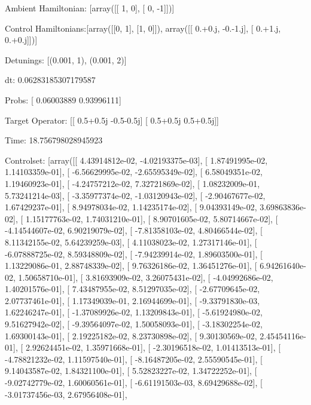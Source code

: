 \documentclass{article}
\begin{document}
    

\newpage

Ambient Hamiltonian: [array([[ 1,  0],
       [ 0, -1]])]

Control Hamiltonians:[array([[0, 1],
       [1, 0]]), array([[ 0.+0.j, -0.-1.j],
       [ 0.+1.j,  0.+0.j]])]

Detunings: [(0.001, 1), (0.001, 2)]

 dt: 0.06283185307179587

Probs: [ 0.06003889  0.93996111]

Target Operator: [[ 0.5+0.5j -0.5-0.5j]
 [ 0.5+0.5j  0.5+0.5j]]

Time: 18.756798028945923

Controlset: [array([[  4.43914812e-02,  -4.02193375e-03],
       [  1.87491995e-02,   1.14103359e-01],
       [ -6.56629995e-02,  -2.65595349e-02],
       [  6.58049351e-02,   1.19460923e-01],
       [ -4.24757212e-02,   7.32721869e-02],
       [  1.08232009e-01,   5.73241214e-03],
       [ -3.35977374e-02,  -1.03120943e-02],
       [ -2.90467677e-02,   1.67429237e-01],
       [  8.94978034e-02,   1.14235174e-02],
       [  9.04393149e-02,   3.69863836e-02],
       [  1.15177763e-02,   1.74031210e-01],
       [  8.90701605e-02,   5.80714667e-02],
       [ -4.14544607e-02,   6.90219079e-02],
       [ -7.81358103e-02,   4.80466544e-02],
       [  8.11342155e-02,   5.64239259e-03],
       [  4.11038023e-02,   1.27317146e-01],
       [ -6.07888725e-02,   8.59348809e-02],
       [ -7.94239914e-02,   1.89603500e-01],
       [  1.13229086e-01,   2.88748339e-02],
       [  9.76326186e-02,   1.36451276e-01],
       [  6.94261640e-02,   1.50658710e-01],
       [  3.81693909e-02,   3.26075431e-02],
       [ -4.04992686e-02,   1.40201576e-01],
       [  7.43487955e-02,   8.51297035e-02],
       [ -2.67709645e-02,   2.07737461e-01],
       [  1.17349039e-01,   2.16944699e-01],
       [ -9.33791830e-03,   1.62246247e-01],
       [ -1.37089926e-02,   1.13209843e-01],
       [ -5.61924980e-02,   9.51627942e-02],
       [ -9.39564097e-02,   1.50058093e-01],
       [ -3.18302254e-02,   1.69300143e-01],
       [  2.19225182e-02,   8.23730898e-02],
       [  9.30130569e-02,   2.45454116e-01],
       [  2.92624451e-02,   1.35971668e-01],
       [ -2.30196518e-02,   1.01413513e-01],
       [ -4.78821232e-02,   1.11597540e-01],
       [ -8.16487205e-02,   2.55590545e-01],
       [  9.14043587e-02,   1.84321100e-01],
       [  5.52823227e-02,   1.34722252e-01],
       [ -9.02742779e-02,   1.60060561e-01],
       [ -6.61191503e-03,   8.69429688e-02],
       [ -3.01737456e-03,   2.67956408e-01],
\end{document}
